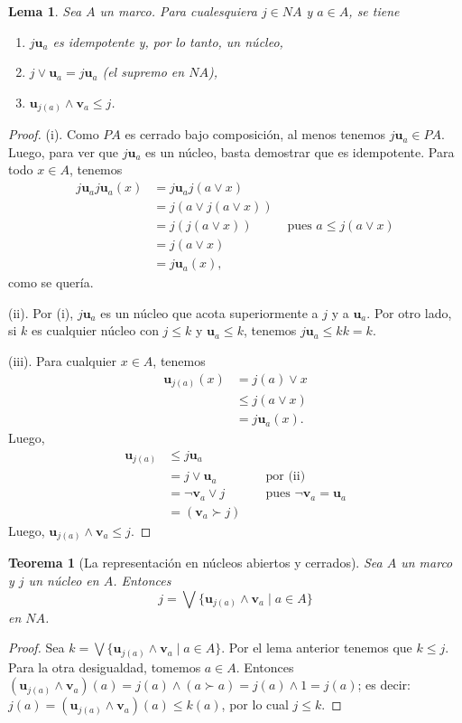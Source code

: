 \documentclass[12pt,letterpaper,titlepage]{article}
\newtheorem{lemma}{Lema}
\newtheorem{thm}{Teorema}
\theoremstyle{definition}
\renewcommand\sup{\vee}
\newcommand\Sup{\bigvee}
\renewcommand\inf{\wedge}
\newcommand\unuc[1]{\mathbf u_{#1}}
\newcommand\vnuc[1]{\mathbf v_{#1}}
\newcommand\<{\langle}
\renewcommand\>{\rangle}
\begin{document}
\begin{lemma}
    \label{lemma:sup-nuc-cerrado}
  Sea $A$ un marco.
  Para cualesquiera $j\in NA$ y $a\in A$, se tiene
  \begin{enumerate}[label=(\roman*)]
    \item $j\unuc a$ es idempotente y, por lo tanto, un núcleo,
    \item $j\sup\unuc a = j\unuc a$ (el supremo en $NA$),
    \item $\unuc{j(a)}\inf\vnuc a\leq j$.
  \end{enumerate}
\end{lemma}
\begin{proof}
  (i). Como $PA$ es cerrado bajo composición, al menos tenemos
  $j\unuc a\in PA$.
  Luego, para ver que $j\unuc a$ es un núcleo,
  basta demostrar que es idempotente.
  Para todo $x\in A$, tenemos
  \begin{align*}
    j\unuc a j\unuc a (x)
    &= j\unuc a j(a\sup x) \\
    &= j(a\sup j(a\sup x)) \\
    &= j(j(a\sup x))
      & \text{ pues } a\leq j(a\sup x) \\
    &= j(a\sup x) \\
    &= j\unuc a (x),
  \end{align*}
  como se quería.

  (ii). Por (i), $j\unuc a$ es un núcleo que acota
  superiormente a $j$ y a $\unuc a$.
  Por otro lado, si $k$ es cualquier núcleo con $j\leq k$ y
  $\unuc a\leq k$, tenemos $j\unuc a \leq kk=k$.

  (iii). Para cualquier $x\in A$, tenemos
  \begin{align*}
    \unuc{j(a)}(x)
    &= j(a)\sup x \\
    &\leq j(a \sup x) \\
    &= j\unuc a(x).
  \end{align*}
  Luego,
  \begin{align*}
    \unuc{j(a)}
    &\leq j\unuc a \\
    &= j\sup \unuc a && \text{ por (ii)} \\
    &= \neg \vnuc a \sup j
      && \text{ pues } \neg\vnuc a = \unuc a \\
    &= (\vnuc a \succ j)
  \end{align*}
  Luego, $\unuc{j(a)} \inf \vnuc a \leq j$.
\end{proof}

\begin{thm}[La representación en núcleos abiertos y cerrados]
  Sea $A$ un marco y $j$ un núcleo en $A$.
  Entonces
  \[
    j = \Sup\{ \unuc{j(a)}\inf\vnuc a \mid a\in A\}
  \]
  en $NA$.
\end{thm}
\begin{proof}
Sea $k=\bigvee\{\unuc {j(a)}\wedge \vnuc a\mid a\in A\}$.
Por el lema anterior tenemos que $k\leq j$.
Para la otra desigualdad, tomemos $a\in A$.
Entonces $(\unuc {j(a)}\wedge \vnuc a)(a)=j(a)\wedge (a\succ a)=j(a)\wedge 1=j(a)$;
es decir: $j(a)=(\unuc {j(a)}\wedge \vnuc a)(a)\leq k(a)$,
por lo cual $j\leq k$.
\end{proof}
\end{document}
